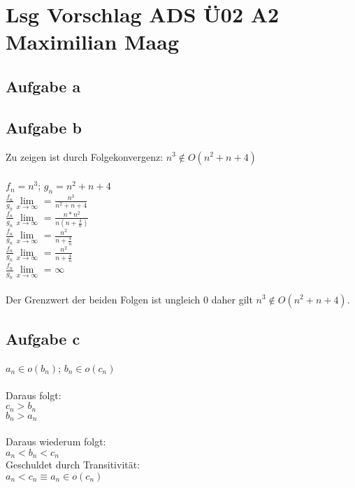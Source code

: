 \documentclass{article}
\begin{document}
	\section*{Lsg Vorschlag ADS Ü02 A2 Maximilian Maag}
	\subsection*{Aufgabe a}

	

	\subsection*{Aufgabe b}
	Zu zeigen ist durch Folgekonvergenz: $n^3 
	\notin O(n^2 + n +4)$  \\ \\
	$f_n = n^3$; $g_n = n^2 + n + 4$ \\
	$\frac{f_n}{g_n} \lim\limits_{x \to \infty}$ = $\frac{n^3}{n^2 + n + 4}$ \\
	$\frac{f_n}{g_n} \lim\limits_{x \to \infty}$ = $\frac{n * n^2}{n(n + \frac{4}{n})}$ \\
	$\frac{f_n}{g_n} \lim\limits_{x \to \infty}$ = $\frac{n^2}{n + \frac{4}{n}}$ \\
	$\frac{f_n}{g_n} \lim\limits_{x \to \infty}$ = $\frac{n^2}{n + \frac{4}{n}}$ \\
	$\frac{f_n}{g_n} \lim\limits_{x \to \infty}$ = $\infty$ \\ \\
	Der Grenzwert der beiden Folgen ist ungleich 0 daher gilt $n^3 \notin O(n^2 + n + 4)$.
	\subsection*{Aufgabe c}
	$a_n \in o(b_n)$; $b_n \in o(c_n)$ \\ \\
	Daraus folgt: \\
	$c_n > b_n$ \\
	$b_n > a_n$  \\
	\\
	Daraus wiederum folgt: \\
	$a_n < b_n < c_n$ \\
	Geschuldet durch Transitivität: \\
	$a_n < c_n \equiv a_n \in o(c_n)$ 
\end{document}
